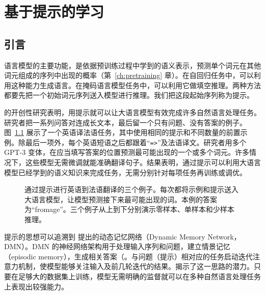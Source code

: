 \chapter{基于提示的学习}
\label{ch:prompting}

\section{引言}
语言模型的主要功能，是依据预训练过程中学到的语义表示，预测单个词元在其他词元组成的序列中出现的概率（第~\ref{ch:pretraining} 章）。在自回归任务中，可以利用这种能力生成语言。在掩码语言模型任务中，可以利用它做填空推理。两种方法都要先把一个初始词元序列送入模型进行推理。我们把这段起始序列称为提示。

的开创性研究表明，用提示就可以让大语言模型有效完成许多自然语言处理任务。研究者把一系列问答对连成长文本，最后留一个只有问题、没有答案的例子。图~\ref{fig:ch03-translation} 展示了一个英语译法语任务，其中使用相同的提示和不同数量的前置示例。除最后一项外，每个英语短语之后都跟着“\texttt{=>}”及法语译文。研究者用多个 GPT-3 变体，在应当填写答案的位置预测最可能出现的一个或多个词元。许多情况下，这些模型无需微调就能准确翻译句子。结果表明，通过提示可以利用大语言模型已经学到的语义知识来完成任务，无需分别针对每项任务再训练或调优。

\begin{figure}[!htbp]
\centering

\caption{通过提示进行英语到法语翻译的三个例子。每次都将示例和提示送入大语言模型，让模型预测接下来最可能出现的词。本例的答案为“fromage”。三个例子从上到下分别演示零样本、单样本和少样本推理。}
\label{fig:ch03-translation}
\end{figure}

提示的思想可以追溯到 提出的动态记忆网络（Dynamic Memory Network，DMN）。DMN 的神经网络架构用于处理输入序列和问题，建立情景记忆（episodic memory），生成相关答案（。与问题（提示）相对应的任务启动迭代注意力机制，使模型能够关注输入及前几轮迭代的结果。揭示了这一思路的潜力。只要在足够大的数据集上训练，模型无需明确的监督就可以在多种自然语言处理任务上表现出较强能力。

